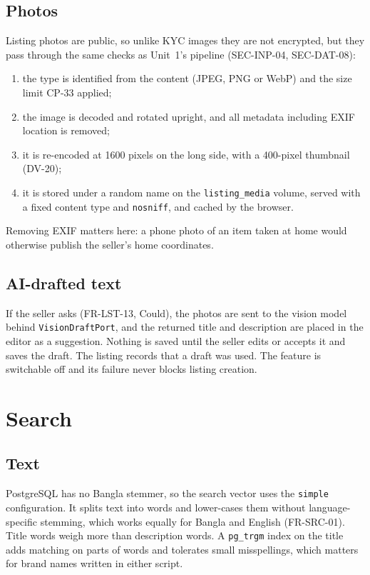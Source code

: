 \documentclass[11pt,a4paper]{article}
\begin{document}
\subsection{Photos}
\label{sec:media}
Listing photos are public, so unlike KYC images they are not encrypted, but they pass through the same checks as Unit~1's pipeline (SEC-INP-04, SEC-DAT-08):
\begin{enumerate}[nosep]
  \item the type is identified from the content (JPEG, PNG or WebP) and the size limit CP-33 applied;
  \item the image is decoded and rotated upright, and all metadata including EXIF location is removed;
  \item it is re-encoded at 1600 pixels on the long side, with a 400-pixel thumbnail (DV-20);
  \item it is stored under a random name on the \texttt{listing\_media} volume, served with a fixed content type and \texttt{nosniff}, and cached by the browser.
\end{enumerate}
Removing EXIF matters here: a phone photo of an item taken at home would otherwise publish the seller's home coordinates.

\subsection{AI-drafted text}
\label{sec:ai}
If the seller asks (FR-LST-13, Could), the photos are sent to the vision model behind \texttt{VisionDraftPort}, and the returned title and description are placed in the editor as a suggestion. Nothing is saved until the seller edits or accepts it and saves the draft. The listing records that a draft was used. The feature is switchable off and its failure never blocks listing creation.

\section{Search}
\label{sec:search}
\subsection{Text}
PostgreSQL has no Bangla stemmer, so the search vector uses the \texttt{simple} configuration. It splits text into words and lower-cases them without language-specific stemming, which works equally for Bangla and English (FR-SRC-01). Title words weigh more than description words. A \texttt{pg\_trgm} index on the title adds matching on parts of words and tolerates small misspellings, which matters for brand names written in either script.
\end{document}
